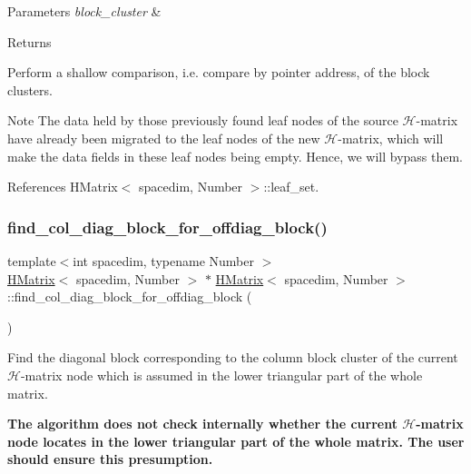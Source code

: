\begin{DoxyParams}{Parameters}
{\em block\+\_\+cluster} & \\
\hline
\end{DoxyParams}
\begin{DoxyReturn}{Returns}

\end{DoxyReturn}
Perform a shallow comparison, i.\+e. compare by pointer address, of the block clusters.


\begin{DoxyDescription}
\item[Note ]The data held by those previously found leaf nodes of the source $\mathcal{H}$-\/matrix have already been migrated to the leaf nodes of the new $\mathcal{H}$-\/matrix, which will make the data fields in these leaf nodes being empty. Hence, we will bypass them. 
\end{DoxyDescription}

References H\+Matrix$<$ spacedim, Number $>$\+::leaf\+\_\+set.

\mbox{\label{classHMatrix_a1ab763860706b9cbef8f5e73d995f29a}} 
\subsubsection{\texorpdfstring{find\+\_\+col\+\_\+diag\+\_\+block\+\_\+for\+\_\+offdiag\+\_\+block()}{find\_col\_diag\_block\_for\_offdiag\_block()}}
{\footnotesize\ttfamily template$<$int spacedim, typename Number $>$ \\
\hyperlink{classHMatrix}{H\+Matrix}$<$ spacedim, Number $>$ $\ast$ \hyperlink{classHMatrix}{H\+Matrix}$<$ spacedim, Number $>$\+::find\+\_\+col\+\_\+diag\+\_\+block\+\_\+for\+\_\+offdiag\+\_\+block (\begin{DoxyParamCaption}{ }\end{DoxyParamCaption})}

Find the diagonal block corresponding to the column block cluster of the current $\mathcal{H}$-\/matrix node which is assumed in the lower triangular part of the whole matrix.

{\bfseries The algorithm does not check internally whether the current $\mathcal{H}$-\/matrix node locates in the lower triangular part of the whole matrix. The user should ensure this presumption.}

